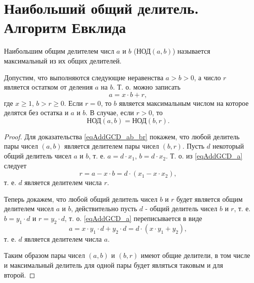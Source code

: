 \section{Наибольший общий делитель. Алгоритм Евклида}
\label{AddEuclidean}
\begin{definition}
Наибольшим общим делителем числ $a$ и $b$ ($\mbox{НОД}\left(a,
b\right)$) называется максимальный из их общих делителей.
\label{defAddGCD}
\end{definition}

\begin{theorem}
Допустим, что выполняются следующие неравенства
$a > b > 0$, а число $r$ является остатком от деления $a$ на
$b$. Т. о. можно записать 
\begin{equation}
a = x \cdot b + r,
\label{eqAddGCD_a}
\end{equation}
где $x \ge 1$, $b > r \ge 0$. Если $r=0$, то $b$ является максимальным числом на
которое делятся без остатка и $a$ и $b$. В случае, если $r > 0$, то
\begin{equation}
\mbox{НОД}\left(a, b\right) = \mbox{НОД}\left(b, r\right).
\label{eqAddGCD_ab_br}
\end{equation}
\end{theorem}

\begin{proof}
Для доказательства \eqref{eqAddGCD_ab_br} покажем, что любой делитель
пары чисел $\left(a,b\right)$  является делителем пары чисел
$\left(b,r\right)$. Пусть $d$ некоторый общий делитель чисел  $a$ и
$b$, т. е. $a = d \cdot x_1$, $b = d \cdot x_2$. Т. о. из \eqref{eqAddGCD_a} следует
\begin{equation}
r = a - x \cdot b = 
d \cdot \left( x_1 - x \cdot x_2 \right),
\nonumber
\end{equation}
т. е. $d$ является делителем числа $r$.

Теперь докажем, что любой общий делитель чисел $b$ и $r$ будет является общим
делителем чисел $a$ и $b$, действительно пусть $d$ - общий делитель
чисел $b$ и $r$, т. е. $b = y_1 \cdot d$ и  $r = y_2 \cdot d$,
т. о. \eqref{eqAddGCD_a} переписывается в виде
\begin{equation}
a = x \cdot y_1 \cdot d + y_2 \cdot d = d \cdot \left( x \cdot y_1 +
y_2 \right),
\nonumber
\end{equation}
т. е. $d$ является делителем числа $a$.

Таким образом пары чисел  $\left(a,b\right)$  и $\left(b,r\right)$
имеют общие делители, в том числе и максимальный делитель для одной
пары будет являться таковым и для второй.  
\end{proof}

